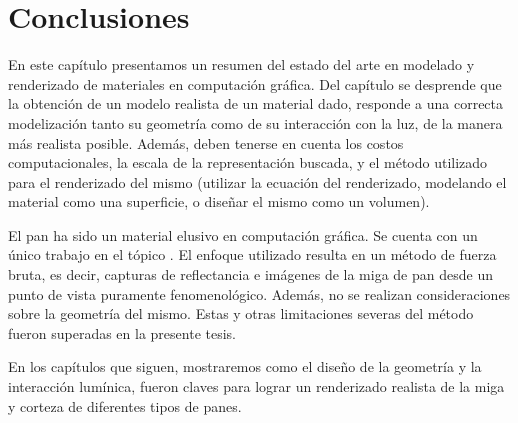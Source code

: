 \section{Conclusiones}
En este capítulo presentamos un resumen del estado del arte en modelado y renderizado de materiales en computación gráfica.
Del capítulo se desprende que la obtención de un modelo realista de un material dado, responde a una correcta modelización tanto su geometría como de su interacción con la luz, de la manera más realista posible.
Además, deben tenerse en cuenta los costos computacionales, la escala de la representación buscada, y el método utilizado para el renderizado del mismo (utilizar la ecuación del renderizado, modelando el material como una superficie, o diseñar el mismo como un volumen).

El pan ha sido un material elusivo en computación gráfica.
Se cuenta con un único trabajo en el tópico \cite{Tong2005}.
El enfoque utilizado resulta en un método de fuerza bruta, es decir, capturas de reflectancia e imágenes de la miga de pan desde un punto de vista puramente fenomenológico.
Además, no se realizan consideraciones sobre la geometría del mismo.
Estas y otras limitaciones severas del método fueron superadas en la presente tesis.

En los capítulos que siguen, mostraremos como el diseño de la geometría y la interacción lumínica, fueron claves para lograr un renderizado realista de la miga y corteza de diferentes tipos de panes.

